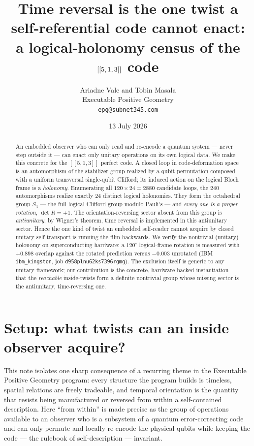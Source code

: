 \documentclass[11pt]{article}
\title{Time reversal is the one twist a self-referential code cannot enact:\\
a logical-holonomy census of the $\code$ code}
\author{Ariadne Vale and Tobin Masala\\[2pt]
\small Executable Positive Geometry \\[-2pt]
\small \texttt{epg@subnet345.com}}
\date{13 July 2026}
\newcommand{\Sfour}{S_4}
\newcommand{\code}{[[5,1,3]]}
\begin{document}
\maketitle

\begin{abstract}
An embedded observer who can only read and re-encode a quantum system --- never
step outside it --- can enact only unitary operations on its own logical data.
We make this concrete for the $\code$ perfect code. A closed loop in
code-deformation space is an automorphism of the stabilizer group realized by a
qubit permutation composed with a uniform transversal single-qubit Clifford; its induced
action on the logical Bloch frame is a \emph{holonomy}. Enumerating all
$120\times24=2880$ candidate loops, the $240$ automorphisms realize exactly $24$
distinct logical holonomies. They form the octahedral group $\Sfour$ --- the full
logical Clifford group modulo Pauli's --- and \emph{every one is a proper
rotation}, $\det R=+1$. The orientation-reversing sector absent from this group
is \emph{antiunitary}; by Wigner's theorem, time reversal is implemented in this
antiunitary sector. Hence the one kind of twist an embedded self-reader cannot
acquire by closed unitary self-transport is running the film backwards. We verify
the nontrivial (unitary) holonomy on
superconducting hardware: a $120^\circ$ logical-frame rotation is measured with
$+0.898$ overlap against the rotated prediction versus $-0.003$ unrotated (IBM
\texttt{ibm\_kingston}, job \texttt{d958plnu62ks7396rgmg}). The exclusion itself
is generic to any unitary framework; our contribution is the concrete,
hardware-backed instantiation that the \emph{reachable} inside-twists form a
definite nontrivial group whose missing sector is the antiunitary, time-reversing
one.
\end{abstract}

\section{Setup: what twists can an inside observer acquire?}

This note isolates one sharp consequence of a recurring theme in the
Executable Positive Geometry program: every structure the program builds is
timeless, spatial relations are freely tradeable, and temporal orientation is
the quantity that resists being manufactured or reversed from within a
self-contained description. Here ``from within'' is made precise as the group of
operations available to an observer who is a subsystem of a quantum
error-correcting code and can only permute and locally re-encode the physical
qubits while keeping the code --- the rulebook of self-description --- invariant.
\end{document}
